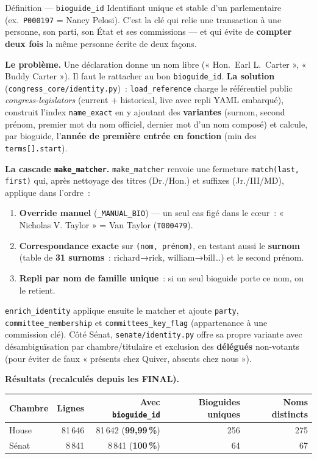 \documentclass[11pt,a4paper]{article}
\newcommand{\co}[1]{\texttt{\small #1}}
\begin{document}
\begin{defbox}{Définition — \co{bioguide_id}}
Identifiant unique et stable d'un parlementaire (ex.~\co{P000197} = Nancy Pelosi). C'est la clé qui
relie une transaction à une personne, son parti, son État et ses commissions — et qui évite de
\textbf{compter deux fois} la même personne écrite de deux façons.
\end{defbox}

\textbf{Le problème.} Une déclaration donne un nom libre (« Hon.~Earl L.~Carter », « Buddy Carter »).
Il faut le rattacher au bon \co{bioguide_id}. \textbf{La solution} (\co{congress_core/identity.py})~:
\co{load_reference} charge le référentiel public \emph{congress-legislators} (current + historical, live
avec repli YAML embarqué), construit l'index \co{name_exact} en y ajoutant des \textbf{variantes}
(surnom, second prénom, premier mot du nom officiel, dernier mot d'un nom composé) et calcule, par
bioguide, l'\textbf{année de première entrée en fonction} (min des \co{terms[].start}).

\textbf{La cascade \co{make_matcher}.} \co{make_matcher} renvoie une fermeture \co{match(last, first)}
qui, après nettoyage des titres (Dr./Hon.) et suffixes (Jr./III/MD), applique dans l'ordre~:
\begin{enumerate}[nosep,leftmargin=1.6em]
\item \textbf{Override manuel} (\co{_MANUAL_BIO}) — un seul cas figé dans le c\oe{}ur~: « Nicholas V.
Taylor » = Van Taylor (\co{T000479}).
\item \textbf{Correspondance exacte} sur \co{(nom, prénom)}, en testant aussi le \textbf{surnom} (table
de \textbf{31 surnoms}~: richard→rick, william→bill\dots) et le second prénom.
\item \textbf{Repli par nom de famille unique}~: si un seul bioguide porte ce nom, on le retient.
\end{enumerate}
\co{enrich_identity} applique ensuite le matcher et ajoute \co{party}, \co{committee_membership} et
\co{committees_key_flag} (appartenance à une commission clé). Côté Sénat, \co{senate/identity.py} offre
sa propre variante avec désambiguïsation par chambre/titulaire et exclusion des \textbf{délégués}
non-votants (pour éviter de faux « présents chez Quiver, absents chez nous »).

\textbf{Résultats (recalculés depuis les FINAL).}
\begin{center}\small
\begin{tabular}{lrrrr}
\toprule
\bfseries Chambre & \bfseries Lignes & \bfseries Avec \co{bioguide_id} & \bfseries Bioguides uniques & \bfseries Noms distincts\\
\midrule
House & 81\,646 & 81\,642 \;(\textbf{99,99\,\%}) & 256 & 275 \\
Sénat & 8\,841 & 8\,841 \;(\textbf{100\,\%}) & 64 & 67 \\
\bottomrule
\end{tabular}
\end{center}
\end{document}
